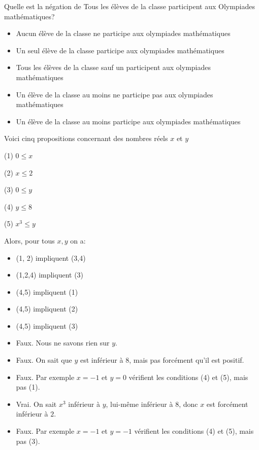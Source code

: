 \documentclass[12pt,french,oneside,a4paper]{memoir} %
\begin{document}
\begin{exo}
  Quelle est la négation de \og Tous les élèves de la classe participent aux Olympiades mathématiques\fg{}?
  \begin{itemize}
  \item Aucun élève de la classe ne participe aux olympiades mathématiques
  \item Un seul élève de la classe participe aux olympiades mathématiques
  \item Tous les élèves de la classe sauf un participent aux olympiades mathématiques
  \item Un élève de la classe au moins ne participe pas aux olympiades mathématiques
  \item Un élève de la classe au moins participe aux olympiades mathématiques
  \end{itemize}
\end{exo}

\begin{exo}
Voici cinq propositions concernant des nombres réels $x$ et $y$

\begin{trivlist}
\item[(1)] $0\leq x$
\item[(2)] $x\leq 2$
\item[(3)] $0\leq y$
\item[(4)] $y\leq 8$
\item[(5)] $x^3\leq y$
\end{trivlist}

Alors, pour tous $x,y$ on a:
\begin{itemize}
\item (1, 2) impliquent (3,4)
\item (1,2,4) impliquent (3)
\item (4,5) impliquent (1)
\item (4,5) impliquent (2)
\item (4,5) impliquent (3)
\end{itemize}
\begin{correction}
  \begin{itemize}
  \item Faux. Nous ne savons rien sur $y$.
  \item Faux. On sait que $y$ est inférieur à $8$, mais pas forcément qu'il est positif.
  \item Faux. Par exemple $x = -1$ et $y = 0$ vérifient les conditions (4) et (5), mais pas (1).
  \item Vrai. On sait $x^{3}$ inférieur à $y$, lui-même inférieur à $8$, donc $x$ est forcément inférieur à $2$.
  \item Faux. Par exemple $x = -1$ et $y = -1$ vérifient les conditions (4) et (5), mais pas (3).
  \end{itemize}
\end{correction}
\end{exo}
\end{document}

